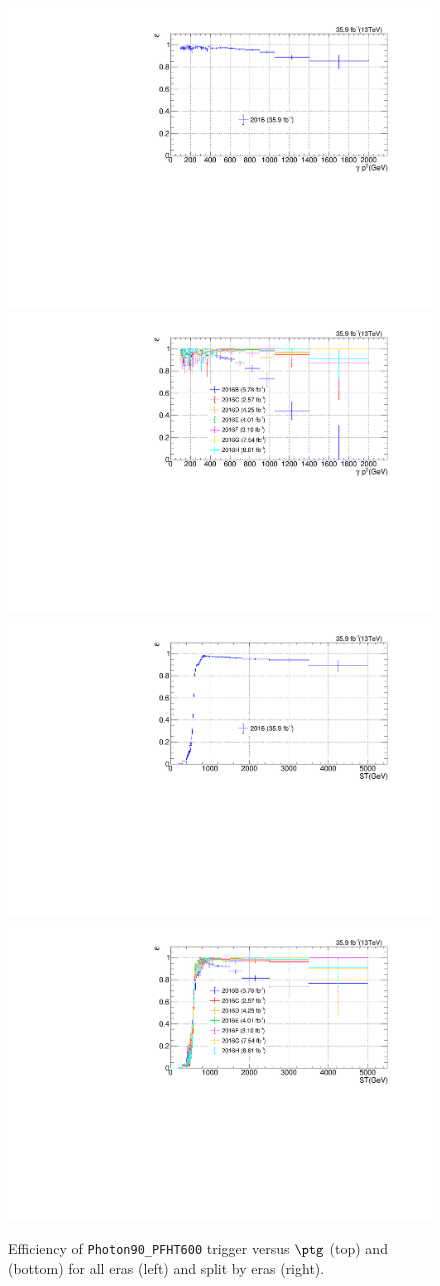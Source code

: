 \begin{figure}[htbp!]
  \centering
  \includegraphics[width=0.48\linewidth]{../Figures/Chap3/triggers/photon90_PFHT600_eff_versusPt_allEras.pdf}
  \includegraphics[width=0.48\linewidth]{../Figures/Chap3/triggers/photon90_PFHT600_eff_versusPt_versusEra.pdf}\\
  \includegraphics[width=0.48\linewidth]{../Figures/Chap3/triggers/photon90_PFHT600_eff_versusST_allEras.pdf}
  \includegraphics[width=0.48\linewidth]{../Figures/Chap3/triggers/photon90_PFHT600_eff_versusST_versusEra.pdf}
  \captionsetup{width=.9\linewidth}
  \caption[Photon90\_PFHT600 trigger efficiency]{Efficiency of \texttt{Photon90\_PFHT600} trigger versus $\ptg$ (top) and \ST (bottom) for all eras (left) and split by eras (right).}
  \label{fig:photon90_ht600_eff}
\end{figure}

